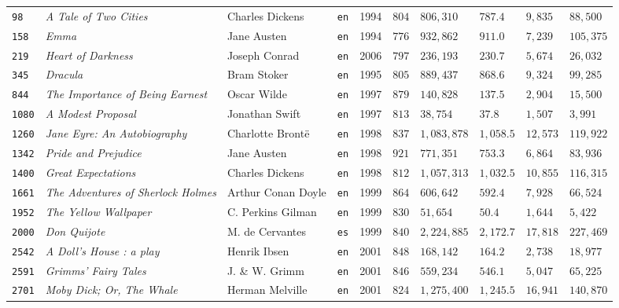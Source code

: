 \documentclass[10pt,a4paper]{article}
\begin{document}
\begin{table}[!htbp]
\begin{tabularx}{\textwidth}{R{0.8cm} Y L{3.0cm} C{0.6cm} C{0.7cm} R{1.2cm} R{1.5cm} R{1.2cm} R{1.3cm} R{1.4cm}}
\texttt{98}    & \emph{A Tale of Two Cities} & Charles Dickens & \texttt{en} & 1994 & $804$ & $806,310$ & $787.4$ & $9,835$ & $88,500$ \\
\texttt{158}   & \emph{Emma} & Jane Austen & \texttt{en} & 1994 & $776$ & $932,862$ & $911.0$ & $7,239$ & $105,375$ \\
\texttt{219}   & \emph{Heart of Darkness} & Joseph Conrad & \texttt{en} & 2006 & $797$ & $236,193$ & $230.7$ & $5,674$ & $26,032$ \\
\texttt{345}   & \emph{Dracula} & Bram Stoker & \texttt{en} & 1995 & $805$ & $889,437$ & $868.6$ & $9,324$ & $99,285$ \\
\texttt{844}   & \emph{The Importance of Being Earnest} & Oscar Wilde & \texttt{en} & 1997 & $879$ & $140,828$ & $137.5$ & $2,904$ & $15,500$ \\
\texttt{1080}  & \emph{A Modest Proposal} & Jonathan Swift & \texttt{en} & 1997 & $813$ & $38,754$ & $37.8$ & $1,507$ & $3,991$ \\
\texttt{1260}  & \emph{Jane Eyre: An Autobiography} & Charlotte Bront\"e & \texttt{en} & 1998 & $837$ & $1,083,878$ & $1,058.5$ & $12,573$ & $119,922$ \\
\texttt{1342}  & \emph{Pride and Prejudice} & Jane Austen & \texttt{en} & 1998 & $921$ & $771,351$ & $753.3$ & $6,864$ & $83,936$ \\
\texttt{1400}  & \emph{Great Expectations} & Charles Dickens & \texttt{en} & 1998 & $812$ & $1,057,313$ & $1,032.5$ & $10,855$ & $116,315$ \\
\texttt{1661}  & \emph{The Adventures of Sherlock Holmes} & Arthur Conan Doyle & \texttt{en} & 1999 & $864$ & $606,642$ & $592.4$ & $7,928$ & $66,524$ \\
\texttt{1952}  & \emph{The Yellow Wallpaper} & C. Perkins Gilman & \texttt{en} & 1999 & $830$ & $51,654$ & $50.4$ & $1,644$ & $5,422$ \\
\texttt{2000}  & \emph{Don Quijote} & M. de Cervantes & \texttt{es} & 1999 & $840$ & $2,224,885$ & $2,172.7$ & $17,818$ & $227,469$ \\
\texttt{2542}  & \emph{A Doll's House : a play} & Henrik Ibsen & \texttt{en} & 2001 & $848$ & $168,142$ & $164.2$ & $2,738$ & $18,977$ \\
\texttt{2591}  & \emph{Grimms' Fairy Tales} & J. \& W. Grimm & \texttt{en} & 2001 & $846$ & $559,234$ & $546.1$ & $5,047$ & $65,225$ \\
\texttt{2701}  & \emph{Moby Dick; Or, The Whale} & Herman Melville & \texttt{en} & 2001 & $824$ & $1,275,400$ & $1,245.5$ & $16,941$ & $140,870$ \\

\end{tabularx}
\end{table}
\end{document}
